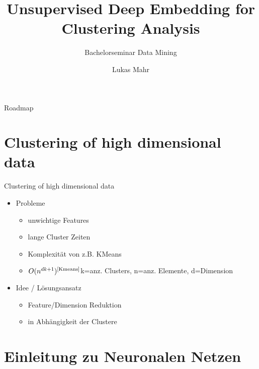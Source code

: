 \documentclass{beamer}
\title{Unsupervised Deep Embedding for Clustering Analysis}
\subtitle{Bachelorseminar Data Mining}
\author{Lukas Mahr}
\institute{Ludwig-Maximilians-Universität München}
\date{}
\begin{document}
\begin{frame}
\titlepage
\end{frame}


\begin{frame}[plain]{Roadmap}
\tableofcontents
\end{frame}

\section{Clustering of high dimensional data}
\begin{frame}[t]{Clustering of high dimensional data}\vspace{4pt}
\begin{itemize}
\item Probleme
\begin{itemize}
\item unwichtige Features
\item lange Cluster Zeiten
\item Komplexität von z.B. KMeans
\item $O(n^{dk+1})^{\text{\cite{Kmeans}}}$k=anz. Clusters, n=anz. Elemente, d=Dimension
\end{itemize}
\item Idee / Lösungsansatz 
\begin{itemize}
\item Feature/Dimension Reduktion
\item in Abhängigkeit der Clustere
\end{itemize}
\end{itemize}
\end{frame}

\section{Einleitung zu Neuronalen Netzen}
\end{document}
